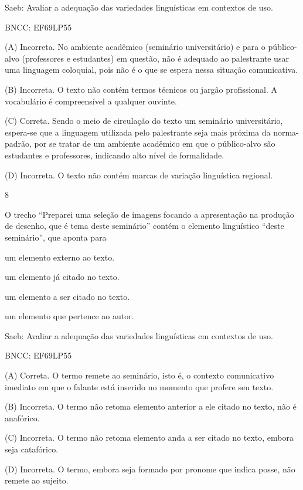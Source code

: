 Saeb: Avaliar a adequação das variedades linguísticas em contextos de
uso.

BNCC: EF69LP55

(A) Incorreta. No ambiente acadêmico (seminário universitário) e para o
público-alvo (professores e estudantes) em questão, não é adequado ao
palestrante usar uma linguagem coloquial, pois não é o que se espera
nessa situação comunicativa.

(B) Incorreta. O texto não contém termos técnicos ou jargão
profissional. A vocabulário é compreensível a qualquer ouvinte.

(C) Correta. Sendo o meio de circulação do texto um seminário
universitário, espera-se que a linguagem utilizada pelo palestrante seja
mais próxima da norma-padrão, por se tratar de um ambiente acadêmico em
que o público-alvo são estudantes e professores, indicando alto nível de
formalidade.

(D) Incorreta. O texto não contém marcas de variação linguística
regional.

\num{8}

O trecho ``Preparei uma seleção de imagens focando a apresentação na
produção de desenho, que é tema deste seminário'' contém o elemento
linguístico ``deste seminário'', que aponta para

\begin{escolha}
\item um elemento externo ao texto.

\item um elemento já citado no texto.

\item um elemento a ser citado no texto.

\item um elemento que pertence ao autor.
\end{escolha}

Saeb: Avaliar a adequação das variedades linguísticas em contextos de
uso.

BNCC: EF69LP55

(A) Correta. O termo remete ao seminário, isto é, o contexto
comunicativo imediato em que o falante está inserido no momento que
profere seu texto.

(B) Incorreta. O termo não retoma elemento anterior a ele citado no
texto, não é anafórico.

(C) Incorreta. O termo não retoma elemento anda a ser citado no texto,
embora seja catafórico.

(D) Incorreta. O termo, embora seja formado por pronome que indica
posse, não remete ao sujeito.

